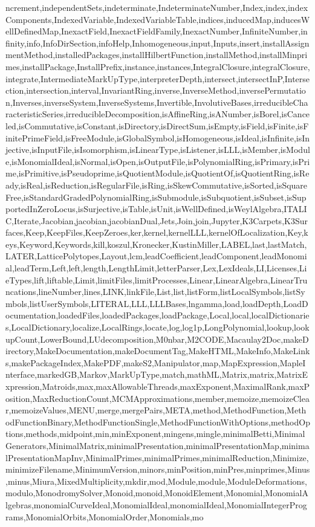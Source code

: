 {ncrement,independentSets,indeterminate,IndeterminateNumber,Index,index,indexComponents,IndexedVariable,IndexedVariableTable,indices,inducedMap,inducesWellDefinedMap,InexactField,InexactFieldFamily,InexactNumber,InfiniteNumber,infinity,info,InfoDirSection,infoHelp,Inhomogeneous,input,Inputs,insert,installAssignmentMethod,installedPackages,installHilbertFunction,installMethod,installMinprimes,installPackage,InstallPrefix,instance,instances,IntegralClosure,integralClosure,integrate,IntermediateMarkUpType,interpreterDepth,intersect,intersectInP,Intersection,intersection,interval,InvariantRing,inverse,InverseMethod,inversePermutation,Inverses,inverseSystem,InverseSystems,Invertible,InvolutiveBases,irreducibleCharacteristicSeries,irreducibleDecomposition,isAffineRing,isANumber,isBorel,isCanceled,isCommutative,isConstant,isDirectory,isDirectSum,isEmpty,isField,isFinite,isFinitePrimeField,isFreeModule,isGlobalSymbol,isHomogeneous,isIdeal,isInfinite,isInjective,isInputFile,isIsomorphism,isLinearType,isListener,isLLL,isMember,isModule,isMonomialIdeal,isNormal,isOpen,isOutputFile,isPolynomialRing,isPrimary,isPrime,isPrimitive,isPseudoprime,isQuotientModule,isQuotientOf,isQuotientRing,isReady,isReal,isReduction,isRegularFile,isRing,isSkewCommutative,isSorted,isSquareFree,isStandardGradedPolynomialRing,isSubmodule,isSubquotient,isSubset,isSupportedInZeroLocus,isSurjective,isTable,isUnit,isWellDefined,isWeylAlgebra,ITALIC,Iterate,Jacobian,jacobian,jacobianDual,Jets,Join,join,Jupyter,K3Carpets,K3Surfaces,Keep,KeepFiles,KeepZeroes,ker,kernel,kernelLLL,kernelOfLocalization,Key,keys,Keyword,Keywords,kill,koszul,Kronecker,KustinMiller,LABEL,last,lastMatch,LATER,LatticePolytopes,Layout,lcm,leadCoefficient,leadComponent,leadMonomial,leadTerm,Left,left,length,LengthLimit,letterParser,Lex,LexIdeals,LI,Licenses,LieTypes,lift,liftable,Limit,limitFiles,limitProcesses,Linear,LinearAlgebra,LinearTruncations,lineNumber,lines,LINK,linkFile,List,list,listForm,listLocalSymbols,listSymbols,listUserSymbols,LITERAL,LLL,LLLBases,lngamma,load,loadDepth,LoadDocumentation,loadedFiles,loadedPackages,loadPackage,Local,local,localDictionaries,LocalDictionary,localize,LocalRings,locate,log,log1p,LongPolynomial,lookup,lookupCount,LowerBound,LUdecomposition,M0nbar,M2CODE,Macaulay2Doc,makeDirectory,MakeDocumentation,makeDocumentTag,MakeHTML,MakeInfo,MakeLinks,makePackageIndex,MakePDF,makeS2,Manipulator,map,MapExpression,MapleInterface,markedGB,Markov,MarkUpType,match,mathML,Matrix,matrix,MatrixExpression,Matroids,max,maxAllowableThreads,maxExponent,MaximalRank,maxPosition,MaxReductionCount,MCMApproximations,member,memoize,memoizeClear,memoizeValues,MENU,merge,mergePairs,META,method,MethodFunction,MethodFunctionBinary,MethodFunctionSingle,MethodFunctionWithOptions,methodOptions,methods,midpoint,min,minExponent,mingens,mingle,minimalBetti,MinimalGenerators,MinimalMatrix,minimalPresentation,minimalPresentationMap,minimalPresentationMapInv,MinimalPrimes,minimalPrimes,minimalReduction,Minimize,minimizeFilename,MinimumVersion,minors,minPosition,minPres,minprimes,Minus,minus,Miura,MixedMultiplicity,mkdir,mod,Module,module,ModuleDeformations,modulo,MonodromySolver,Monoid,monoid,MonoidElement,Monomial,MonomialAlgebras,monomialCurveIdeal,MonomialIdeal,monomialIdeal,MonomialIntegerPrograms,MonomialOrbits,MonomialOrder,Monomials,mo}
